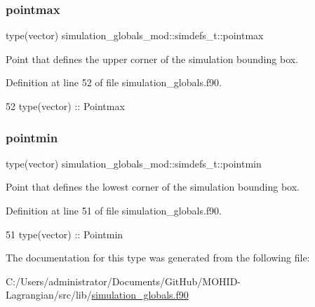 \subsubsection{\texorpdfstring{pointmax}{pointmax}}
{\footnotesize\ttfamily type(vector) simulation\+\_\+globals\+\_\+mod\+::simdefs\+\_\+t\+::pointmax\hspace{0.3cm}{\ttfamily [private]}}



Point that defines the upper corner of the simulation bounding box. 



Definition at line 52 of file simulation\+\_\+globals.\+f90.


\begin{DoxyCode}
52         \textcolor{keywordtype}{type}(vector)    ::  Pointmax
\end{DoxyCode}
\mbox{\label{structsimulation__globals__mod_1_1simdefs__t_af3a5fb325c955840515f199c8be30aa7}} 
\subsubsection{\texorpdfstring{pointmin}{pointmin}}
{\footnotesize\ttfamily type(vector) simulation\+\_\+globals\+\_\+mod\+::simdefs\+\_\+t\+::pointmin\hspace{0.3cm}{\ttfamily [private]}}



Point that defines the lowest corner of the simulation bounding box. 



Definition at line 51 of file simulation\+\_\+globals.\+f90.


\begin{DoxyCode}
51         \textcolor{keywordtype}{type}(vector)    ::  Pointmin
\end{DoxyCode}


The documentation for this type was generated from the following file\+:\begin{DoxyCompactItemize}
\item 
C\+:/\+Users/administrator/\+Documents/\+Git\+Hub/\+M\+O\+H\+I\+D-\/\+Lagrangian/src/lib/\mbox{\hyperlink{simulation__globals_8f90}{simulation\+\_\+globals.\+f90}}\end{DoxyCompactItemize}
